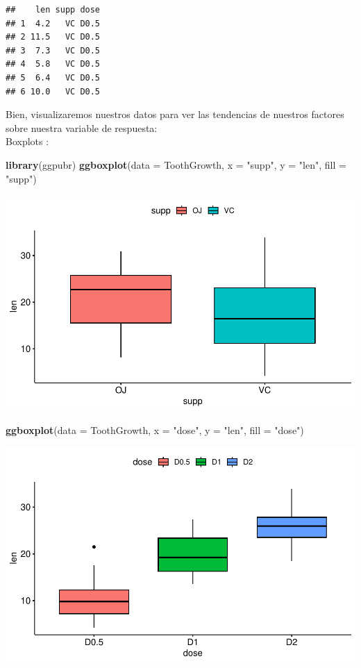 \documentclass[
]{book}
\newenvironment{Shaded}{\begin{snugshade}}{\end{snugshade}}
\newcommand{\AttributeTok}[1]{\textcolor[rgb]{0.13,0.29,0.53}{#1}}
\newcommand{\FunctionTok}[1]{\textcolor[rgb]{0.13,0.29,0.53}{\textbf{#1}}}
\newcommand{\NormalTok}[1]{#1}
\newcommand{\StringTok}[1]{\textcolor[rgb]{0.31,0.60,0.02}{#1}}
\begin{document}
\begin{verbatim}
##    len supp dose
## 1  4.2   VC D0.5
## 2 11.5   VC D0.5
## 3  7.3   VC D0.5
## 4  5.8   VC D0.5
## 5  6.4   VC D0.5
## 6 10.0   VC D0.5
\end{verbatim}

\hfill\break
Bien, visualizaremos nuestros datos para ver las tendencias de nuestros factores sobre nuestra variable de respuesta:\\
Boxplots
:

\begin{Shaded}
\begin{Highlighting}[]
\FunctionTok{library}\NormalTok{(ggpubr)}
\FunctionTok{ggboxplot}\NormalTok{(}\AttributeTok{data =}\NormalTok{ ToothGrowth, }\AttributeTok{x =} \StringTok{"supp"}\NormalTok{, }\AttributeTok{y =} \StringTok{"len"}\NormalTok{, }\AttributeTok{fill =} \StringTok{"supp"}\NormalTok{)}
\end{Highlighting}
\end{Shaded}

\includegraphics{R_Manual_files/figure-latex/unnamed-chunk-262-1.pdf}

\begin{Shaded}
\begin{Highlighting}[]
\FunctionTok{ggboxplot}\NormalTok{(}\AttributeTok{data =}\NormalTok{ ToothGrowth, }\AttributeTok{x =} \StringTok{"dose"}\NormalTok{, }\AttributeTok{y =} \StringTok{"len"}\NormalTok{, }\AttributeTok{fill =} \StringTok{"dose"}\NormalTok{)}
\end{Highlighting}
\end{Shaded}

\includegraphics{R_Manual_files/figure-latex/unnamed-chunk-262-2.pdf}
\end{document}
